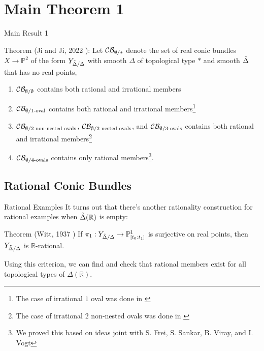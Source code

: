 \documentclass[hyperref, notheorems]{beamer}
\newcommand{\Rbb}{\mathbb{R}}
\newcommand{\Pbb}{\mathbb{P}}
\newcommand{\Ydd}{Y_{\Tilde{\Delta} /\Delta}}
\theoremstyle{definition}
\begin{document}
\section{Main Theorem 1}

\begin{frame}{Main Result 1}
\begin{block}{Theorem (Ji and Ji, 2022 \cite{main-paper}):}
    Let \(\cal C\cal B_{\emptyset/*}\) denote the set of real conic bundles \(X\to \Pbb^2\) of the form $\Ydd$ with smooth \(\Delta\) of topological type \(*\) and smooth \(\Tilde{\Delta}\) that has no real points,
    \begin{enumerate}
        \item \(\cal C\cal B_{\emptyset/\emptyset}\) contains both rational and irrational members 
        \item \(\cal C\cal B_{\emptyset/\text{1-oval}}\) contains both rational and irrational members\footnote{The case of irrational $1$ oval was done in \cite{FJSVV}}
        \item \(\cal C\cal B_{\emptyset/\text{2 non-nested ovals}}\), \(\cal C\cal B_{\emptyset/\text{2 nested ovals}}\), and \(\cal C\cal B_{\emptyset/\text{3-ovals}}\) contains both rational and irrational members\footnote{The case of irrational $2$ non-nested ovals was done in \cite{FJSVV}}
        \item \(\cal C\cal B_{\emptyset/\text{4-ovals}}\) contains only rational members\footnote{We proved this based on ideas joint with S. Frei, S. Sankar, B. Viray, and I. Vogt}.
    \end{enumerate}
\end{block}
\end{frame}

\subsection{Rational Conic Bundles}

\begin{frame}{Rational Examples}
    It turns out that there's another rationality construction for rational examples when $\Tilde{\Delta}(\Rbb)$ is empty:
    \begin{block}{Theorem (Witt, 1937 \cite{Witt-quadratic-forms})}
        If $\pi_1: \Ydd \to \Pbb^1_{[t_0: t_1]}$ is surjective on real points, then $\Ydd$ is $\Rbb$-rational.
    \end{block}
    Using this criterion, we can find and check that rational members exist for all topological types of $\Delta(\Rbb)$.

\end{frame}
\end{document}
